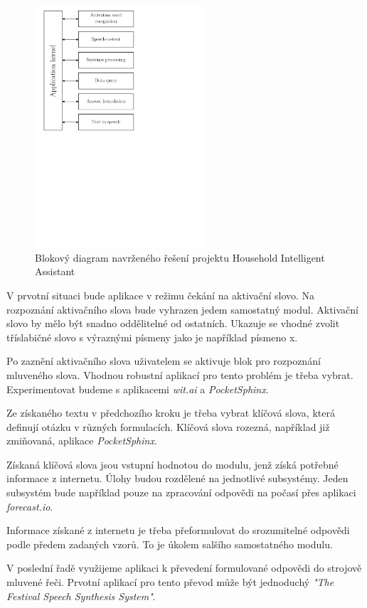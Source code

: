 \documentclass[12pt,a4paper]{article}
\begin{document}
\begin{figure}[ht!]
	\begin{center}
	\includegraphics[height = 9cm]{blockDiagram.pdf}
	\caption{Blokový diagram navrženého řešení projektu Household Intelligent Assistant}
	\label{fig:diagram api}
	\end{center}
\end{figure}

V prvotní situaci bude aplikace v režimu čekání na aktivační slovo. Na rozpoznání aktivačního slova bude vyhrazen jedem samostatný modul. Aktivační slovo by mělo být snadno oddělitelné od ostatních. Ukazuje se vhodné zvolit tříslabičné slovo s výraznými písmeny jako je například písmeno x.

Po zaznění aktivačního slova uživatelem se aktivuje blok pro rozpoznání mluveného slova. Vhodnou robustní aplikací pro tento problém je třeba vybrat. Experimentovat budeme s aplikacemi \textit{wit.ai} a \textit{PocketSphinx}.

Ze získaného textu v předchozího kroku je třeba vybrat klíčová slova, která definují otázku v různých formulacích. Klíčová slova rozezná, například již zmiňovaná, aplikace \textit{PocketSphinx}.

Získaná klíčová slova jsou vstupní hodnotou do modulu, jenž získá potřebné informace z internetu. Úlohy budou rozdělené na jednotlivé subsystémy. Jeden subsystém bude například pouze na zpracování odpovědi na počasí přes aplikaci \textit{forecast.io}.

Informace získané z internetu je třeba přeformulovat do srozumitelné odpovědi podle předem zadaných vzorů. To je úkolem salšího samostatného modulu.

V poslední řadě využijeme aplikaci k převedení formulované odpovědi do strojově mluvené řeči. Prvotní aplikací pro tento převod může být jednoduchý \textit{"The Festival Speech Synthesis System"}.
\end{document}
